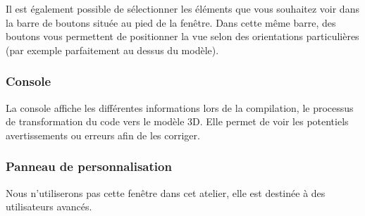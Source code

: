 Il est également possible de sélectionner les éléments que vous souhaitez voir dans la barre de boutons située au pied de la fenêtre.
Dans cette même barre, des boutons vous permettent de positionner la vue selon des orientations particulières (par exemple parfaitement au dessus du modèle).


\subsubsection{Console}

La console affiche les différentes informations lors de la compilation, le processus de transformation du code vers le modèle 3D.
Elle permet de voir les potentiels avertissements ou erreurs afin de les corriger.


\subsubsection{Panneau de personnalisation}

Nous n'utiliserons pas cette fenêtre dans cet atelier, elle est destinée à des utilisateurs avancés.
